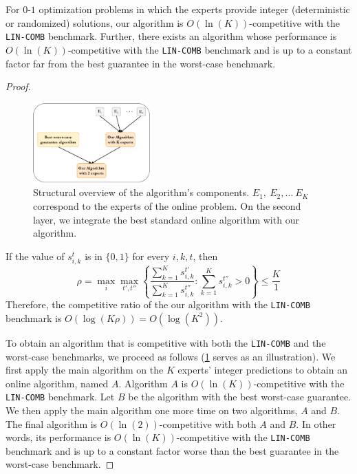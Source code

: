\begin{corollary} \label{corollary}
	For $0$-$1$ optimization problems in which the experts provide integer (deterministic or randomized) solutions,
	our algorithm is $O(\ln (K))$-competitive with the \texttt{LIN-COMB} benchmark.
	Further, there exists an algorithm whose performance is $O(\ln (K))$-competitive with the \texttt{LIN-COMB}
	benchmark and is up to a constant factor far from the best guarantee in the worst-case benchmark.
\end{corollary}
%
\begin{proof}

	\begin{figure}[!ht]
		\centering
		\includegraphics[width=0.4\textwidth]{../paper/Img/algo_structure.pdf}
		\caption{Structural overview of the algorithm's components. $E_1,\ E_2, \dots\ E_K$ correspond to the experts of the online problem. On the second layer, we integrate the best standard online algorithm with our algorithm. }
		\label{fig:algo-layers}
	\end{figure}

	\noindent If the value of $s_{i,k}^{t}$ is in $\{0,1\}$ for every $i,k,t$, then
	\[
	\rho = \max_{i} \max_{t',t''} \left\{\frac{\sum_{k=1}^{K} s_{i,k}^{t'}}{\sum_{k=1}^{K} s_{i,k}^{t''}} : \sum_{k=1}^{K} s_{i,k}^{t''} > 0 \right\}
	\leq \frac{K}{1}
	\]
	Therefore, the competitive ratio of the our algorithm with the \texttt{LIN-COMB} benchmark is $O(\log (K \rho)) = O(\log (K^2))$.

 	To obtain an algorithm that is competitive with both the \texttt{LIN-COMB} and the worst-case benchmarks, we proceed as follows (\cref{fig:algo-layers} serves as an illustration).
	We first apply the main algorithm on the $K$ experts' integer predictions to obtain an online algorithm, named $A$.
	Algorithm $A$ is $O(\ln (K))$-competitive with the \texttt{LIN-COMB} benchmark. Let $B$ be the algorithm with the best worst-case guarantee.
	We then apply the main algorithm one more time on two algorithms, $A$ and $B$. The final algorithm is $O(\ln (2))$-competitive with both $A$ and $B$.
	In other words, its performance is $O(\ln (K))$-competitive with the \texttt{LIN-COMB} benchmark and is up to a constant factor worse than the best guarantee in the worst-case benchmark.

\end{proof}

